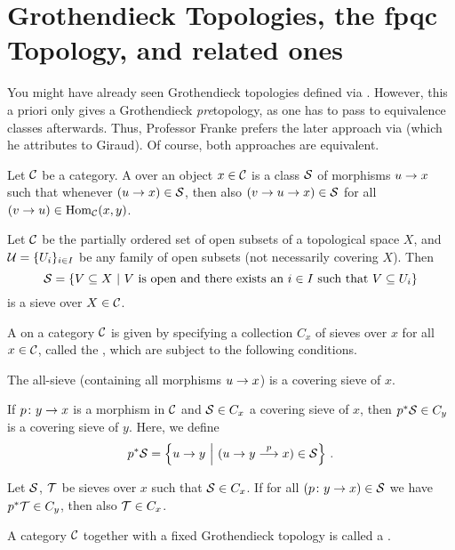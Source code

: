 \section{Grothendieck Topologies, the fpqc Topology, and related ones}
You might have already seen Grothendieck topologies defined via . However, this a priori only gives a Grothendieck \emph{pre}topology, as one has to pass to equivalence classes afterwards. Thus, Professor Franke prefers the later approach via  (which he attributes to Giraud). Of course, both approaches are equivalent.
\begin{defi}
	Let $\mathcal{C}$ be a category. A  over an object $x\in \mathcal{C}$ is a class $\mathcal{S}$ of morphisms $u\morphism x$ such that whenever $(u\morphism x)\in \Ss$, then also $(v\morphism u\morphism x)\in\Ss$ for all $(v\morphism u)\in\Hom_\Cc(x,y)$.
\end{defi}
\begin{exm}
	Let $\mathcal{C}$ be the partially ordered set of open subsets of a topological space $X$, and $\mathcal{U}=\{U_i\}_{i\in I}$ be any family of open subsets (not necessarily covering $X$). Then
	\begin{equation*}
		\mathcal{S}=\left\{V\subseteq X\ \middle|\  V\text{ is open and there exists an }i\in I\text{ such that }V\subseteq U_i\right\}
	\end{equation*}
	is a sieve over $X\in \mathcal{C}$.
\end{exm}
\begin{defi}\label{def:GrothendieckTopo}
	A  on a category $\mathcal{C}$ is given by specifying a collection $ C_x$ of sieves over $x$ for all $x\in \mathcal{C}$, called the , which are subject to the following conditions.
	\begin{alphanumerate}
		\item The all-sieve (containing all morphisms $u\morphism x$) is a covering sieve of $x$.
		\item If $p\colon y\morphism x$ is a morphism in $\mathcal{C}$ and $\mathcal{S}\in C_x$ a covering sieve of $x$, then $p^*\mathcal{S}\in C_y$ is a covering sieve of $y$. Here, we define
		\begin{equation*}
			p^*\Ss=\left\{u\to y\st (u\to y\morphism[p]x)\in \Ss\right\}\,.
		\end{equation*}
		\item Let $\mathcal{S}$, $\mathcal{T}$ be sieves over $x$ such that $\mathcal{S}\in  C_x$. If for all $(p\colon y\morphism x)\in \Ss$ we have $p^*\mathcal{T}\in C_y$, then also $\mathcal{T}\in C_x$.
	\end{alphanumerate}
	A category $\mathcal{C}$ together with a fixed Grothendieck topology is called a .
\end{defi}
